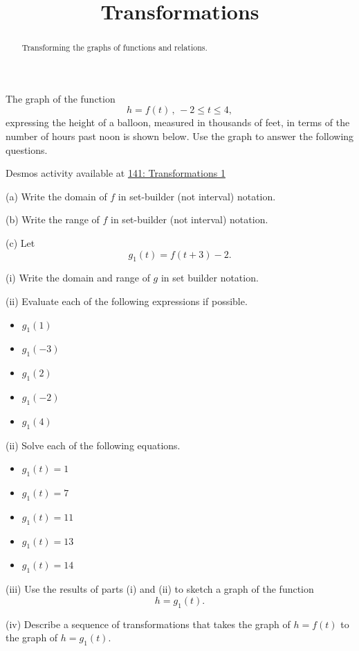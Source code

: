 \documentclass{ximera}
\title{Transformations}
\begin{document}
\begin{abstract}
Transforming the graphs of functions and relations.
\end{abstract}
\maketitle


\begin{question}  \label{Q:3d3rfff}
The graph of the function
\[
   h = f(t) \,  ,  \, -2 \leq t \leq 4,
\]
expressing the height of a balloon, measured in thousands of feet, in terms of the number of hours past noon is shown below. Use the graph to answer the following questions.


\begin{onlineOnly}
    \begin{center}
\end{center}
\end{onlineOnly}

Desmos activity available at \href{https://www.desmos.com/calculator/vr35614ucf}{141: Transformations 1}


(a) Write the domain of $f$ in set-builder (not interval) notation.

(b) Write the range of $f$ in set-builder (not interval) notation.

(c) Let 
\[
    g_1(t) = f(t+3) - 2 .
\]
 
(i) Write the domain and range of $g$ in set builder notation.

(ii) Evaluate each of the following expressions if possible.

\begin{itemize}
\item{$g_1(1)$}

\item{$g_1(-3)$}

\item{$g_1(2)$}

\item{$g_1(-2)$}

\item{$g_1(4)$}
\end{itemize}

(ii) Solve each of the following equations.

\begin{itemize}
\item{$g_1(t) = 1$}

\item{$g_1(t) = 7$}

\item{$g_1(t) = 11$}

\item{$g_1(t) = 13$}

\item{$g_1(t) = 14$}
\end{itemize}

(iii) Use the results of parts (i) and (ii) to sketch a graph of the function 
\[
      h = g_1(t).
\]

(iv) Describe a sequence of transformations that takes the graph of $h=f(t)$ to the graph of $h=g_1(t)$.

\end{question}
\end{document}
